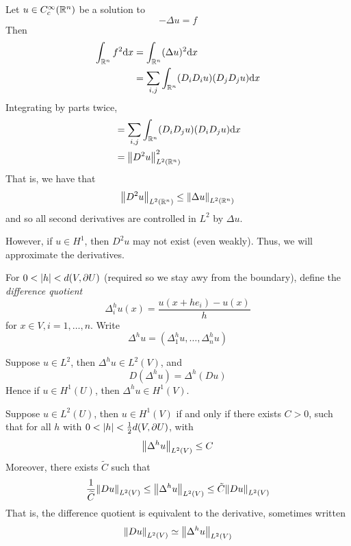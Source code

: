 \documentclass{article}
\begin{document}
\begin{example}
    Let \(u \in C_c^\infty(\mathbb{R}^n)\) be a solution to
    \[-\Delta u = f\]
    Then
    \begin{align*}
        \int_{\mathbb{R}^n}f^2 \dd x &= \int_{\mathbb{R}^n}(\Delta u)^2 \dd x\\
        &=\sum_{i, j}\int_{\mathbb{R}^n}(D_iD_i u)(D_j D_j u)\dd x
    \end{align*}
    Integrating by parts twice,
    \begin{align*}
        &= \sum_{i, j}\int_{\mathbb{R}^n}(D_iD_ju)(D_iD_ju) \dd x \\
        &= \norm{D^2 u}^2_{L^2(\mathbb{R}^n)}
    \end{align*}
    That is, we have that
    \[\norm{D^2u}_{L^2(\mathbb{R}^n)} \le \norm{\Delta u}_{L^2(\mathbb{R}^n)}\]
    and so all second derivatives are controlled in \(L^2\) by \(\Delta u\).
\end{example}

However, if \(u \in H^1\), then \(D^2 u\) may not exist (even weakly). Thus, we will approximate the derivatives.

\begin{definition}
    For \(0 < \abs{h} < d(V, \partial U)\) (required so we stay awy from the boundary), define the \emph{difference quotient}
    \[\Delta^h_iu(x) = \frac{u(x + he_i) - u(x)}{h}\]
    for \(x \in V, i = 1, \dots, n\). Write
    \[\Delta^h u = (\Delta^h_1u, \dots, \Delta^h_nu)\]
\end{definition}

\begin{remark}
    Suppose \(u \in L^2\), then \(\Delta^hu \in L^2(V)\), and
    \[D(\Delta^hu) = \Delta^h(Du)\]
    Hence if \(u \in H^1(U)\), then \(\Delta^hu \in H^1(V)\).
\end{remark}

\begin{lemma}
    \label{lem:diff-quot-equiv}
    Suppose \(u \in L^2(U)\), then \(u \in H^1(V)\) if and only if there exists \(C > 0\), such that for all \(h\) with \(0 < \abs{h} < \frac{1}{2}d(V, \partial U)\), with
    \[\norm{\Delta^hu}_{L^2(V)} \le C\]
    Moreover, there exists \(\widetilde C\) such that
    \[\frac{1}{\widetilde C}\norm{Du}_{L^2(V)} \le \norm{\Delta^hu}_{L^2(V)} \le \tilde C\norm{Du}_{L^2(V)}\]
    That is, the difference quotient is equivalent to the derivative, sometimes written
    \[\norm{Du}_{L^2(V)} \simeq \norm{\Delta^hu}_{L^2(V)}\]
\end{lemma}
\end{document}
